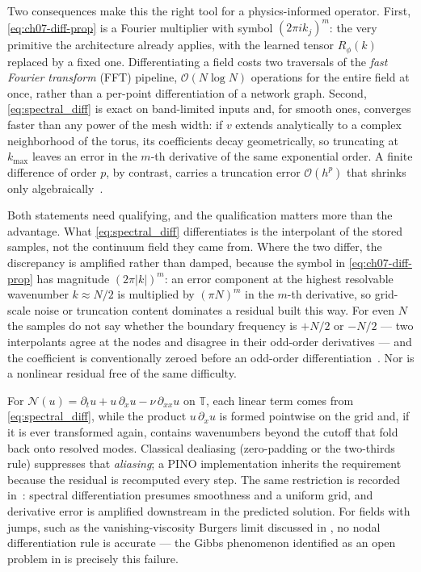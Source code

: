 Two consequences make this the right tool for a physics-informed operator. First,
\eqref{eq:ch07-diff-prop} is a Fourier multiplier with symbol $(2\pi i k_j)^m$: the very
primitive the architecture already applies, with the learned tensor $R_\phi(k)$ replaced by a
fixed one. Differentiating a field costs two traversals of the
\emph{fast Fourier transform} (FFT) pipeline, $\mathcal{O}(N\log N)$ operations for the
entire field at once, rather than a per-point differentiation of a network graph. Second,
\eqref{eq:spectral_diff} is exact on band-limited inputs and, for smooth ones, converges
faster than any power of the mesh width: if $v$ extends analytically to a complex
neighborhood of the torus, its coefficients decay geometrically, so truncating at $k_{\max}$
leaves an error in the $m$-th derivative of the same exponential order. A finite
difference of order $p$, by contrast, carries a truncation error $\mathcal{O}(h^{p})$ that
shrinks only algebraically~\cite{leveque2002finite}. 

Both statements need qualifying, and the qualification matters more than the advantage. What
\eqref{eq:spectral_diff} differentiates is the interpolant of the stored samples, not the
continuum field they came from. Where the two differ, the discrepancy is amplified rather
than damped, because the symbol in \eqref{eq:ch07-diff-prop} has magnitude
$(2\pi|k|)^{m}$: an error component at the highest resolvable wavenumber $k\approx N/2$ is
multiplied by $(\pi N)^{m}$ in the $m$-th derivative, so grid-scale noise or truncation
content dominates a residual built this way. For even $N$ the samples do not say
whether the boundary frequency is $+N/2$ or $-N/2$ --- two interpolants agree at
the nodes and disagree in their odd-order derivatives --- and the coefficient is
conventionally zeroed before an odd-order
differentiation~. Nor is a
nonlinear residual free of the same difficulty.
\begin{example}
For $\mathcal{N}(u) = \partial_t u + u\,\partial_x u - \nu\,\partial_{xx}u$ on $\mathbb{T}$,
each linear term comes from \eqref{eq:spectral_diff}, while the product $u\,\partial_x u$ is
formed pointwise on the grid and, if it is ever transformed again, contains wavenumbers
beyond the cutoff that fold back onto resolved modes. Classical dealiasing (zero-padding or
the two-thirds rule) suppresses that \emph{aliasing}; a PINO implementation inherits the
requirement because the residual is recomputed every step. The same restriction is recorded
in~\cite{li2021physics}: spectral differentiation presumes smoothness and a uniform grid, and
derivative error is amplified downstream in the predicted solution. For fields with jumps,
such as the vanishing-viscosity Burgers limit discussed in
, no nodal differentiation rule
is accurate --- the Gibbs phenomenon identified as an open problem in
 is precisely this failure.
\end{example}

